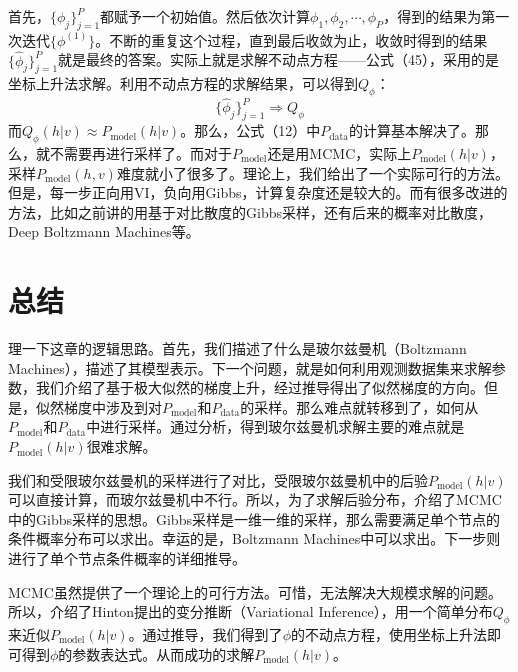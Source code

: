 \documentclass[a4paper]{article}
\begin{document}
首先，$\{ \phi_j \}_{j=1}^P$都赋予一个初始值。然后依次计算$\phi_1,\phi_2,\cdots,\phi_P$，得到的结果为第一次迭代$\{ \phi^{(1)} \}$。不断的重复这个过程，直到最后收敛为止，收敛时得到的结果$\{ \hat{\phi}_j \}_{j=1}^P$就是最终的答案。实际上就是求解不动点方程——公式（45），采用的是坐标上升法求解。利用不动点方程的求解结果，可以得到$Q_\phi$：
\begin{equation}
    \{ \hat{\phi}_j \}_{j=1}^P \Longrightarrow Q_\phi
\end{equation}
而$Q_\phi(h|v) \approx P_{\text{model}}(h|v)$。那么，公式（12）中$P_{\text{data}}$的计算基本解决了。那么，就不需要再进行采样了。而对于$P_{\text{model}}$还是用MCMC，实际上$P_{\text{model}}(h|v)$，采样$P_{\text{model}}(h,v)$难度就小了很多了。理论上，我们给出了一个实际可行的方法。但是，每一步正向用VI，负向用Gibbs，计算复杂度还是较大的。而有很多改进的方法，比如之前讲的用基于对比散度的Gibbs采样，还有后来的概率对比散度，Deep Boltzmann Machines等。

\section{总结}
理一下这章的逻辑思路。首先，我们描述了什么是玻尔兹曼机（Boltzmann Machines），描述了其模型表示。下一个问题，就是如何利用观测数据集来求解参数，我们介绍了基于极大似然的梯度上升，经过推导得出了似然梯度的方向。但是，似然梯度中涉及到对$P_{\text{model}}$和$P_{\text{data}}$的采样。那么难点就转移到了，如何从$P_{\text{model}}$和$P_{\text{data}}$中进行采样。通过分析，得到玻尔兹曼机求解主要的难点就是$P_{\text{model}}(h|v)$很难求解。

我们和受限玻尔兹曼机的采样进行了对比，受限玻尔兹曼机中的后验$P_{\text{model}}(h|v)$可以直接计算，而玻尔兹曼机中不行。所以，为了求解后验分布，介绍了MCMC中的Gibbs采样的思想。Gibbs采样是一维一维的采样，那么需要满足单个节点的条件概率分布可以求出。幸运的是，Boltzmann Machines中可以求出。下一步则进行了单个节点条件概率的详细推导。

MCMC虽然提供了一个理论上的可行方法。可惜，无法解决大规模求解的问题。所以，介绍了Hinton提出的变分推断（Variational Inference），用一个简单分布$Q_\phi$来近似$P_{\text{model}}(h|v)$。通过推导，我们得到了$\phi$的不动点方程，使用坐标上升法即可得到$\phi$的参数表达式。从而成功的求解$P_{\text{model}}(h|v)$。
\end{document}
